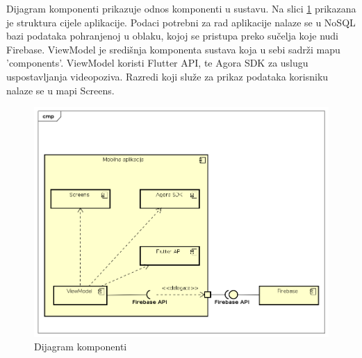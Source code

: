 			Dijagram komponenti prikazuje odnos komponenti u sustavu. Na slici \ref{fig:Dijagram_komponenti} prikazana je struktura cijele aplikacije. Podaci potrebni za rad aplikacije nalaze se u NoSQL bazi podataka pohranjenoj u oblaku, kojoj se pristupa preko sučelja koje nudi Firebase. ViewModel je središnja komponenta sustava koja u sebi sadrži mapu 'components'. ViewModel koristi Flutter API, te Agora SDK za uslugu uspostavljanja videopoziva. Razredi koji služe za prikaz podataka korisniku nalaze se u mapi Screens.
			
			\begin{figure}[h]
				\includegraphics[scale=0.6]{dijagrami/Dijagram_komponenti.PNG}
				\centering
				\caption{Dijagram komponenti}
				\label{fig:Dijagram_komponenti}
			\end{figure}